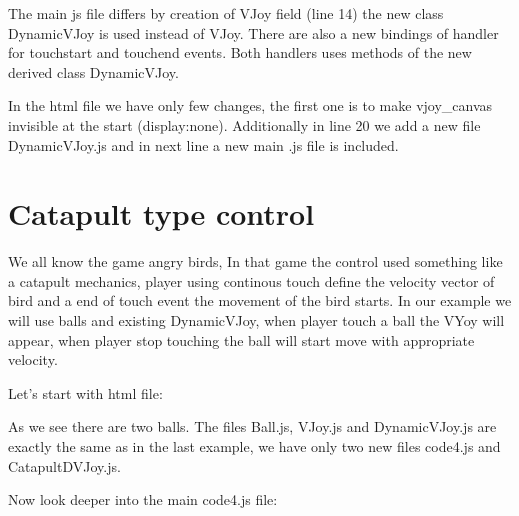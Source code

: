 \begin{explain}
The main js file differs by creation of VJoy field (line 14) the new class DynamicVJoy is used instead of VJoy. There are also a new bindings of handler for touchstart and touchend events. Both handlers uses methods of the new derived class DynamicVJoy.
\end{explain}


\begin{explain}
In the html file we have only few changes, the first one is to make vjoy\_canvas invisible at the start (display:none). Additionally in line 20 we add a new file DynamicVJoy.js and in next line a new main .js file is included.
\end{explain}

\section{Catapult type control}

We all know the game angry birds, In that game the control used something like a catapult mechanics, player using continous touch define the velocity vector of bird and a end of touch event the movement of the bird starts. In our example we will use balls and existing DynamicVJoy, when player touch a ball the VYoy will appear, when player stop touching the ball will start move with appropriate velocity.

Let's start with html file:


As we see there are two balls. The files Ball.js, VJoy.js and DynamicVJoy.js are exactly the same as in the last example, we have only two new files code4.js and CatapultDVJoy.js.

Now look deeper into the main code4.js file:


